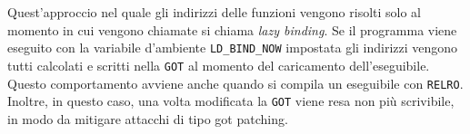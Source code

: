 Quest'approccio nel quale gli indirizzi delle funzioni vengono risolti
solo al momento in cui vengono chiamate si chiama \emph{lazy
  binding}. Se il programma viene eseguito con la variabile d'ambiente
\lstinline{LD_BIND_NOW} impostata gli indirizzi vengono tutti
calcolati e scritti nella \lstinline{GOT} al momento del caricamento
dell'eseguibile. Questo comportamento avviene anche quando si compila
un eseguibile con \lstinline{RELRO}. Inoltre, in questo caso, una
volta modificata la \lstinline{GOT} viene resa non più scrivibile, in
modo da mitigare attacchi di tipo got patching.









